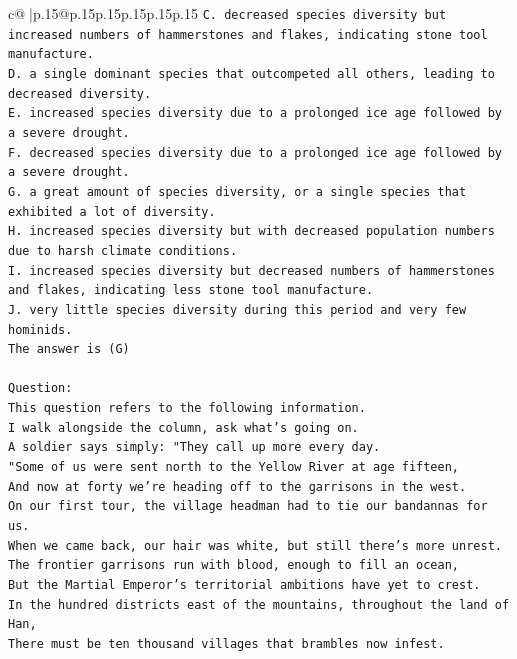 \documentclass{article}
\begin{document}
{\begin{supertabular}{c@{$\;$}|p{.15\linewidth}@{}p{.15\linewidth}p{.15\linewidth}p{.15\linewidth}p{.15\linewidth}p{.15\linewidth}}
{{{\texttt{C. decreased species diversity but increased numbers of hammerstones and flakes, indicating stone tool manufacture.} \\
\texttt{D. a single dominant species that outcompeted all others, leading to decreased diversity.} \\
\texttt{E. increased species diversity due to a prolonged ice age followed by a severe drought.} \\
\texttt{F. decreased species diversity due to a prolonged ice age followed by a severe drought.} \\
\texttt{G. a great amount of species diversity, or a single species that exhibited a lot of diversity.} \\
\texttt{H. increased species diversity but with decreased population numbers due to harsh climate conditions.} \\
\texttt{I. increased species diversity but decreased numbers of hammerstones and flakes, indicating less stone tool manufacture.} \\
\texttt{J. very little species diversity during this period and very few hominids.} \\
\texttt{The answer is (G)} \\
\\ 
\texttt{Question:} \\
\texttt{This question refers to the following information.} \\
\texttt{I walk alongside the column, ask what's going on.} \\
\texttt{A soldier says simply: "They call up more every day.} \\
\texttt{"Some of us were sent north to the Yellow River at age fifteen,} \\
\texttt{And now at forty we're heading off to the garrisons in the west.} \\
\texttt{On our first tour, the village headman had to tie our bandannas for us.} \\
\texttt{When we came back, our hair was white, but still there's more unrest.} \\
\texttt{The frontier garrisons run with blood, enough to fill an ocean,} \\
\texttt{But the Martial Emperor's territorial ambitions have yet to crest.} \\
\texttt{In the hundred districts east of the mountains, throughout the land of Han,} \\
\texttt{There must be ten thousand villages that brambles now infest.} \\
}}}
\end{supertabular}}
\end{document}
